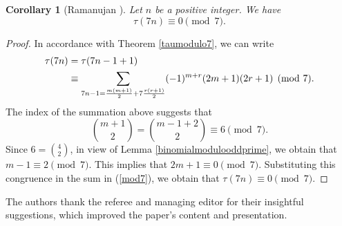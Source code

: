 \documentclass[10pt]{article}
\newtheorem{corollary}[theorem]{Corollary}
\theoremstyle{definition}
\begin{document}
\begin{corollary}[Ramanujan \cite{ramanujan-20}]
Let $n$ be a positive integer. We have
\begin{equation*}
\tau(7n)\equiv 0\pmod{7}.
\end{equation*}
\end{corollary}
\begin{proof}
In accordance with Theorem \ref{taumodulo7}, we can write
\begin{align}
\notag \tau(7n)&=\tau(7n-1+1)\\
&\label{mod7}\equiv\sum_{7n-1=\frac{m(m+1)}{2}+7\frac{r(r+1)}{2}}(-1)^{m+r}(2m+1)(2r+1)\pmod{7}.
\end{align}
The index of the summation above suggests that 
\[{{m+1}\choose{2}}={{m-1+2}\choose{2}}\equiv 6\pmod{7}.
\]
Since $6={4\choose{2}}$, in view of Lemma \ref{binomialmodulooddprime}, we obtain that $m-1\equiv 2\pmod{7}$. This implies that $2m+1\equiv 0\pmod{7}$. Substituting this congruence in the sum in (\ref{mod7}), we obtain that $\tau(7n)\equiv 0\pmod{7}$. 
\end{proof}
 The authors thank the referee and managing editor for their insightful suggestions, which improved the paper's content and presentation. 
\end{document}
